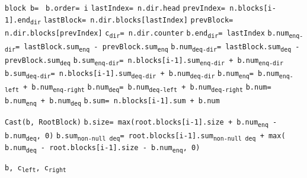 \documentclass[10pt]{article}
\newcommand\keywordfont{\sffamily\bfseries}
\theoremstyle{definition}
\begin{document}
\begin{algorithm}
\begin{algorithmic}[1]
\begin{multicols}{2}
\pagebreak

\Statex{}
\State \texttt{block b= }
\State \texttt{b.order= i}
\ForEach{\texttt{dir} {\keywordfont{in}} \texttt{\{left, right\}}}
\State \texttt{lastIndex= n.dir.head} \label{lastLine}
\State \texttt{prevIndex= n.blocks[i-1].end\textsubscript{dir}} \label{prevLine}
\State \texttt{lastBlock= n.dir.blocks[lastIndex]}
\State \texttt{prevBlock= n.dir.blocks[prevIndex]}
\State \texttt{c\textsubscript{dir}= n.dir.counter}
\State \texttt{b.end\textsubscript{dir}= lastIndex}
\State \texttt{b.num\textsubscript{enq-dir}= lastBlock.sum\textsubscript{enq} - prevBlock.sum\textsubscript{enq}}
\State \texttt{b.num\textsubscript{deq-dir}= lastBlock.sum\textsubscript{deq} - prevBlock.sum\textsubscript{deq}}
\State \texttt{b.sum\textsubscript{enq-dir}= n.blocks[i-1].sum\textsubscript{enq-dir} + b.num\textsubscript{enq-dir}}
\State \texttt{b.sum\textsubscript{deq-dir}= n.blocks[i-1].sum\textsubscript{deq-dir} + b.num\textsubscript{deq-dir}}
\EndFor
\State \texttt{b.num\textsubscript{enq}= b.num\textsubscript{enq-left} + b.num\textsubscript{enq-right}}
\State \texttt{b.num\textsubscript{deq}= b.num\textsubscript{deq-left} + b.num\textsubscript{deq-right}}
\State \texttt{b.num= b.num\textsubscript{enq} + b.num\textsubscript{deq}}
\State \texttt{b.sum= n.blocks[i-1].sum + b.num}

\State \texttt{Cast(b, RootBlock)} 
\State \texttt{b.size= max(root.blocks[i-1].size + b.num\textsubscript{enq} - b.num\textsubscript{deq}, 0)}
\State \texttt{b.sum\textsubscript{non-null deq}= root.blocks[i-1].sum\textsubscript{non-null deq} + max( b.num\textsubscript{deq} - root.blocks[i-1].size - b.num\textsubscript{enq}, 0)}
\EndIf

\State \Return \texttt{b, c\textsubscript{left}, c\textsubscript{right}}

\end{multicols}
\end{algorithmic}
\end{algorithm}
\end{document}
